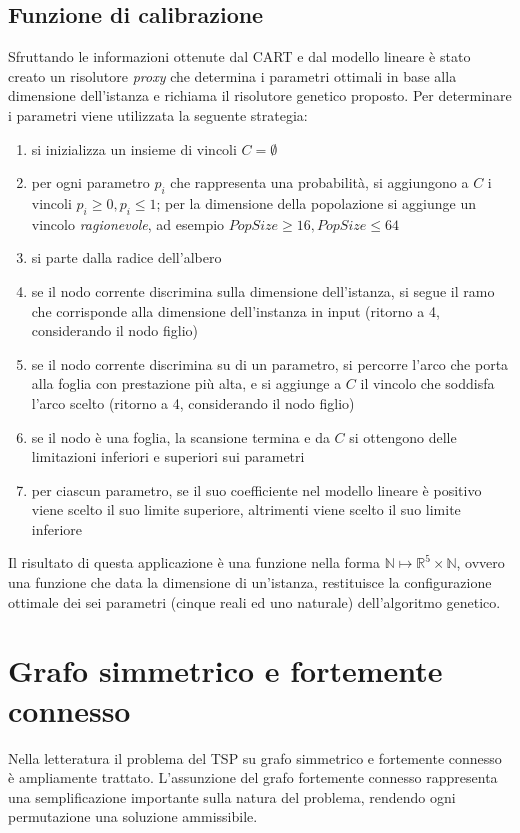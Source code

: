 \documentclass[a4paper, 10pt]{report}
\begin{document}
\section{Funzione di calibrazione}
Sfruttando le informazioni ottenute dal CART e dal modello lineare è
stato creato un risolutore \emph{proxy} che determina i parametri
ottimali in base alla dimensione dell'istanza e richiama il risolutore
genetico proposto. Per determinare i parametri viene utilizzata la
seguente strategia:
\begin{enumerate}
  \item si inizializza un insieme di vincoli $C = \emptyset$
  \item per ogni parametro $p_i$ che rappresenta una probabilità, si
        aggiungono a $C$ i vincoli $p_i \geq 0, p_i \leq 1$; per la
        dimensione della popolazione si aggiunge un vincolo \emph{ragionevole},
        ad esempio $PopSize \geq 16, PopSize \leq 64$
  \item si parte dalla radice dell'albero
  \item se il nodo corrente discrimina sulla dimensione dell'istanza,
        si segue il ramo che corrisponde alla dimensione dell'instanza
        in input (ritorno a 4, considerando il nodo figlio)
  \item se il nodo corrente discrimina su di un parametro, si percorre
        l'arco che porta alla foglia con prestazione più alta, e si
        aggiunge a $C$ il vincolo che soddisfa l'arco scelto (ritorno a 4,
        considerando il nodo figlio)
  \item se il nodo è una foglia, la scansione termina e da $C$ si ottengono
        delle limitazioni inferiori e superiori sui parametri
  \item per ciascun parametro, se il suo coefficiente nel modello lineare è
        positivo viene scelto il suo limite superiore, altrimenti viene
        scelto il suo limite inferiore
\end{enumerate}

Il risultato di questa applicazione è una funzione nella forma
$\mathbb{N} \mapsto \mathbb{R}^5 \times \mathbb{N}$, ovvero una funzione che
data la dimensione di un'istanza, restituisce la configurazione ottimale dei
sei parametri (cinque reali ed uno naturale) dell'algoritmo genetico.



\chapter{Grafo simmetrico e fortemente connesso}
\label{app:ideal}
Nella letteratura il problema del TSP su grafo simmetrico e fortemente
connesso è ampliamente trattato. L'assunzione del grafo fortemente
connesso rappresenta una semplificazione importante sulla natura del
problema, rendendo ogni permutazione una soluzione ammissibile.
\end{document}

